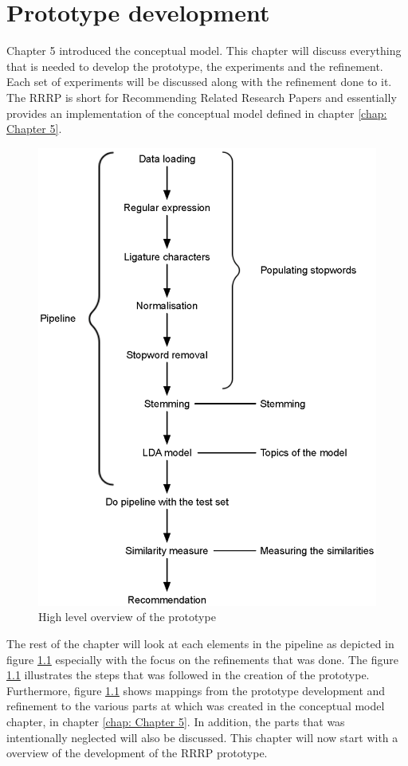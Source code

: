 \chapter{Prototype development}
\label{chap: Chapter 6}


Chapter 5 introduced the conceptual model. This chapter will discuss everything that is needed to develop the prototype, the experiments and the refinement. Each set of experiments will be discussed along with the refinement done to it. The RRRP is short for Recommending Related Research Papers and essentially provides an implementation of the conceptual model defined in chapter \ref{chap: Chapter 5}. 

\begin{figure}[h!]
\centering
\includegraphics[width=12cm]{./figures/flowresearch12.eps}
\caption{High level overview of the prototype}
\label{fig:prototype}
\end{figure}

The rest of the chapter will look at each elements in the pipeline as depicted in figure \ref{fig:prototype} especially with the focus on the refinements that was done.
The figure \ref{fig:prototype} illustrates the steps that was followed in the creation of the prototype. Furthermore, figure \ref{fig:prototype} shows mappings from the prototype development and refinement to the various parts at which was created in the conceptual model chapter, in chapter \ref{chap: Chapter 5}.
In addition, the parts that was intentionally neglected will also be discussed. This chapter will now start with a overview of the development of the RRRP prototype.

